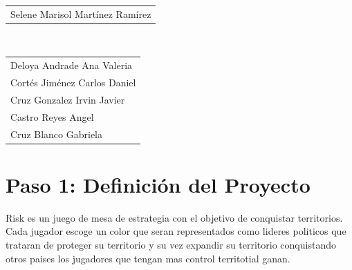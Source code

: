 \documentclass[12pt]{article}
\begin{document}
\begin{titlepage}
\begin{center}
\begin{tabular}{l}
\large Selene Marisol Martínez Ramírez \\[0.5cm]
\end{tabular}

\\[0.6cm]
\color{black}
\centering
\begin{tabular}{l}


\large Deloya Andrade Ana Valeria \\[0.4cm]

\large   Cortés Jiménez Carlos Daniel \\[0.4cm]

\large  Cruz Gonzalez Irvin Javier \\[0.4cm]

\large  Castro Reyes Angel  \\[0.4cm]

\large   Cruz Blanco Gabriela \\[0.4cm]
\end{tabular}

\vfill

\end{center}
\end{titlepage}

 \section*{Paso 1: Definición del Proyecto}

  Risk es un juego de mesa de estrategia con el objetivo de conquistar territorios. Cada jugador escoge un color que seran representados como lideres politicos que trataran de proteger su territorio y su vez expandir su territorio conquistando otros paises los jugadores que tengan mas control territotial ganan.
\end{document}
